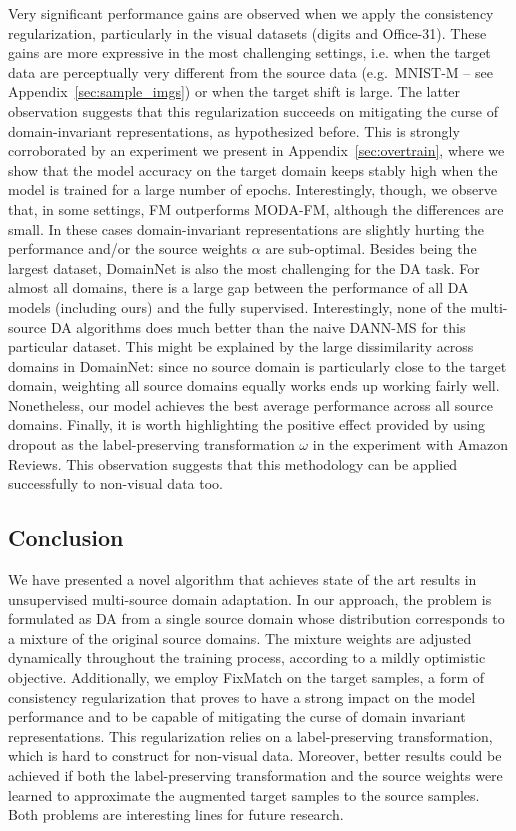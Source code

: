 Very significant performance gains are observed when we apply the consistency regularization, particularly in the visual datasets (digits and Office-31). These gains are more expressive in the most challenging settings, i.e. when the target data are perceptually very different from the source data (e.g.\ MNIST-M -- see Appendix~\ref{sec:sample_imgs}) or when the target shift is large. The latter observation suggests that this regularization succeeds on mitigating the curse of domain-invariant representations, as hypothesized before. This is strongly corroborated by an experiment we present in Appendix~\ref{sec:overtrain}, where we show that the model accuracy on the target domain keeps stably high when the model is trained for a large number of epochs. Interestingly, though, we observe that, in some settings, FM outperforms MODA-FM, although the differences are small. In these cases domain-invariant representations are slightly hurting the performance and/or the source weights $\alpha$ are sub-optimal. Besides being the largest dataset, DomainNet is also the most challenging for the DA task. For almost all domains, there is a large gap between the performance of all DA models (including ours) and the fully supervised. Interestingly, none of the multi-source DA algorithms does much better than the naive DANN-MS for this particular dataset. This might be explained by the large dissimilarity across domains in DomainNet: since no source domain is particularly close to the target domain, weighting all source domains equally works ends up working fairly well. Nonetheless, our model achieves the best average performance across all source domains.  Finally, it is worth highlighting the positive effect provided by using dropout as the label-preserving transformation $\omega$ in the experiment with Amazon Reviews. This observation suggests that this methodology can be applied successfully to non-visual data too.

\subsection{Conclusion}
\label{sec:modafm_conclusion}
We have presented a novel algorithm that achieves state of the art results in unsupervised multi-source domain adaptation. In our approach, the problem is formulated as DA from a single source domain whose distribution corresponds to a mixture of the original source domains. The mixture weights are adjusted dynamically throughout the training process, according to a mildly optimistic objective. Additionally, we employ FixMatch on the target samples, a form of consistency regularization that proves to have a strong impact on the model performance and to be capable of mitigating the curse of domain invariant representations. This regularization relies on a label-preserving transformation, which is hard to construct for non-visual data. Moreover, better results could be achieved if both the label-preserving transformation and the source weights were learned to approximate the augmented target samples to the source samples. Both problems are interesting lines for future research.